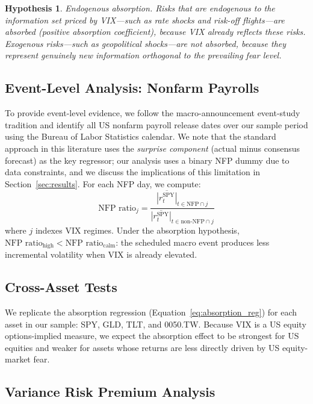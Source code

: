 \documentclass[12pt,a4paper]{article}
\newtheorem{hypothesis}{Hypothesis}
\begin{document}
\begin{hypothesis}
\textit{Endogenous absorption.} Risks that are endogenous to the information set priced by VIX---such as rate shocks and risk-off flights---are absorbed (positive absorption coefficient), because VIX already reflects these risks. Exogenous risks---such as geopolitical shocks---are not absorbed, because they represent genuinely new information orthogonal to the prevailing fear level.
\label{hyp:endo_exo}
\end{hypothesis}

\subsection{Event-Level Analysis: Nonfarm Payrolls}

To provide event-level evidence, we follow the macro-announcement event-study tradition \citep{andersen2003, balduzzi2001} and identify all US nonfarm payroll release dates over our sample period using the Bureau of Labor Statistics calendar. We note that the standard approach in this literature uses the \textit{surprise component} (actual minus consensus forecast) as the key regressor; our analysis uses a binary NFP dummy due to data constraints, and we discuss the implications of this limitation in Section~\ref{sec:results}. For each NFP day, we compute:
\begin{equation}
\text{NFP ratio}_j = \frac{\overline{|r_t^{\text{SPY}}|}_{t \in \text{NFP} \cap j}}{\overline{|r_t^{\text{SPY}}|}_{t \in \text{non-NFP} \cap j}}
\label{eq:nfp_ratio}
\end{equation}
where $j$ indexes VIX regimes. Under the absorption hypothesis, $\text{NFP ratio}_{\text{high}} < \text{NFP ratio}_{\text{calm}}$: the scheduled macro event produces less incremental volatility when VIX is already elevated.

\subsection{Cross-Asset Tests}

We replicate the absorption regression (Equation~\ref{eq:absorption_reg}) for each asset in our sample: SPY, GLD, TLT, and 0050.TW. Because VIX is a US equity options-implied measure, we expect the absorption effect to be strongest for US equities and weaker for assets whose returns are less directly driven by US equity-market fear.

\subsection{Variance Risk Premium Analysis}
\end{document}

